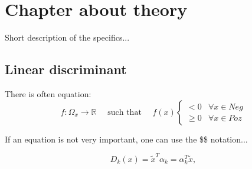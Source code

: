 \chapter{Chapter about theory}\label{ch:THEORY}

\begin{summary}
  Short description of the specifics...
\end{summary}


\section{Linear discriminant}\label{sec:THEORY:linear}

There is often equation:
\begin{equation}
	f: \Omega_x \rightarrow {\mathbb{R}}
	\quad\text{ such that }
	\quad f(x)
	\begin{cases}
		<0 & \forall x\in Neg \\
		\geq 0 & \forall x\in Poz
	\end{cases}
	\label{eq:diszkr:fugg}
\end{equation}



If an equation is not very important, one can use the \$\$ notation...

$$D_k(x)=\tilde{x}^T\alpha_k=\alpha_k^T\tilde{x},$$

